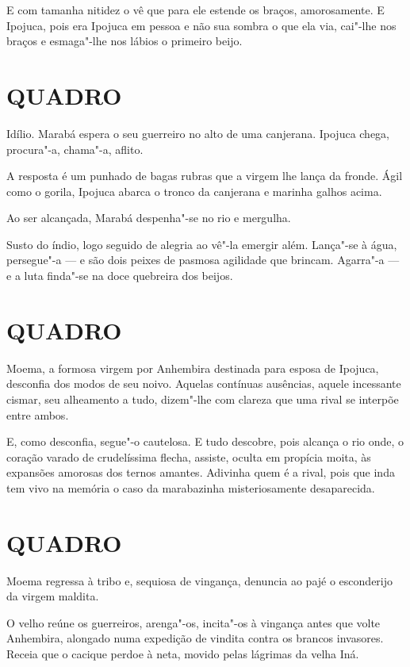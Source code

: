 E com tamanha nitidez o vê que para ele estende os braços, amorosamente.
E Ipojuca, pois era Ipojuca em pessoa e não sua sombra o que ela via,
cai"-lhe nos braços e esmaga"-lhe nos lábios o primeiro beijo.

\section*{QUADRO}

Idílio. Marabá espera o seu guerreiro no alto de uma canjerana. Ipojuca
chega, procura"-a, chama"-a, aflito.

A resposta é um punhado de bagas rubras que a virgem lhe lança da
fronde. Ágil como o gorila, Ipojuca abarca o tronco da canjerana e
marinha galhos acima.

Ao ser alcançada, Marabá despenha"-se no rio e mergulha.

Susto do índio, logo seguido de alegria ao vê"-la emergir além. Lança"-se
à água, persegue"-a --- e são dois peixes de pasmosa agilidade que
brincam. Agarra"-a --- e a luta finda"-se na doce quebreira dos beijos.

\section*{QUADRO}

Moema, a formosa virgem por Anhembira destinada para esposa de Ipojuca,
desconfia dos modos de seu noivo. Aquelas contínuas ausências, aquele
incessante cismar, seu alheamento a tudo, dizem"-lhe com clareza que uma
rival se interpõe entre ambos.

E, como desconfia, segue"-o cautelosa. E tudo descobre, pois alcança o
rio onde, o coração varado de crudelíssima flecha, assiste, oculta em
propícia moita, às expansões amorosas dos ternos amantes. Adivinha quem
é a rival, pois que inda tem vivo na memória o caso da marabazinha
misteriosamente desaparecida.

\section*{QUADRO}

Moema regressa à tribo e, sequiosa de vingança, denuncia ao pajé o
esconderijo da virgem maldita.

O velho reúne os guerreiros, arenga"-os, incita"-os à vingança antes que
volte Anhembira, alongado numa expedição de vindita contra os brancos
invasores. Receia que o cacique perdoe à neta, movido pelas lágrimas da
velha Iná.

